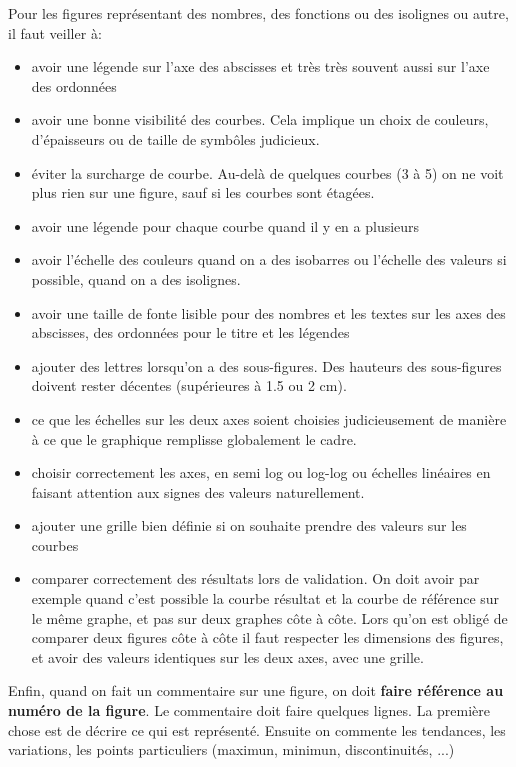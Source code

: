 Pour les figures représentant des nombres, des fonctions ou  des isolignes ou autre,  il faut veiller à:
\begin{itemize}
\item avoir une légende sur l'axe des abscisses et très très souvent aussi sur l'axe des ordonnées
\item avoir une bonne visibilité des courbes. Cela implique un choix de couleurs, d'épaisseurs ou de taille de symbôles judicieux. 
\item éviter la surcharge de courbe. Au-delà de quelques courbes (3 à 5) on ne voit plus rien sur une figure, sauf si les courbes sont étagées. 
\item avoir une légende pour chaque courbe quand il y en a plusieurs
\item avoir l'échelle des couleurs quand on a des isobarres ou l'échelle des valeurs si possible, quand on a des isolignes.
\item avoir une taille de fonte lisible pour  des nombres et les textes
 sur les axes des abscisses, des ordonnées pour le  titre et les légendes
\item ajouter des lettres lorsqu'on a des sous-figures. Des hauteurs des sous-figures doivent rester décentes (supérieures à 1.5 ou 2 cm). 
\item ce que les échelles sur les deux axes soient choisies judicieusement de manière à ce que le graphique remplisse globalement le cadre. 
\item choisir correctement les axes, en semi log ou log-log ou échelles linéaires
en faisant attention aux signes des valeurs naturellement.
\item  ajouter une grille bien définie si on souhaite prendre des valeurs sur les courbes

\item comparer correctement des résultats lors de validation. On doit avoir par exemple quand c'est possible la courbe résultat et la courbe de référence sur le même graphe, et pas sur deux graphes côte à côte. Lors qu'on est obligé de comparer deux figures côte à côte il faut respecter les dimensions des figures, et avoir des valeurs identiques sur les deux axes, avec une grille.
\end{itemize}

Enfin, quand on fait un commentaire sur une figure, on doit \textbf{faire référence au numéro de la figure}. Le commentaire doit faire quelques lignes. La première chose est de décrire ce qui est représenté. Ensuite on commente les tendances, les variations, les points particuliers (maximun, minimun, discontinuités, ...)

